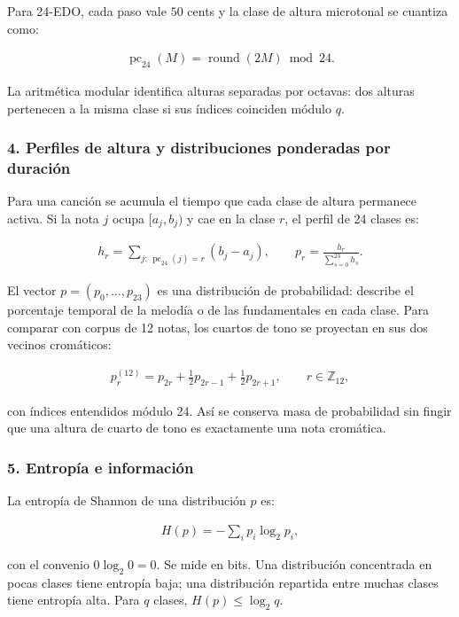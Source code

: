 \documentclass[11pt, a4paper]{article}
\begin{document}
Para 24-EDO, cada paso vale $50$ cents y la clase de altura microtonal se cuantiza como:

\begin{align}
\operatorname{pc}_{24}(M)=\operatorname{round}(2M)\bmod 24.
\end{align}

La aritmética modular identifica alturas separadas por octavas: dos alturas pertenecen a la misma clase si sus índices coinciden módulo $q$.

\subsubsection*{4. Perfiles de altura y distribuciones ponderadas por duración}

Para una canción se acumula el tiempo que cada clase de altura permanece activa. Si la nota $j$ ocupa $[a_j,b_j)$ y cae en la clase $r$, el perfil de 24 clases es:

\begin{align}
h_r=\sum_{j:\,\operatorname{pc}_{24}(j)=r}(b_j-a_j), \qquad
p_r=\frac{h_r}{\sum_{s=0}^{23}h_s}.
\end{align}

El vector $p=(p_0,\ldots,p_{23})$ es una distribución de probabilidad: describe el porcentaje temporal de la melodía o de las fundamentales en cada clase. Para comparar con corpus de 12 notas, los cuartos de tono se proyectan en sus dos vecinos cromáticos:

\begin{align}
p^{(12)}_r=p_{2r}+\frac12p_{2r-1}+\frac12p_{2r+1},
\qquad r\in\mathbb{Z}_{12},
\end{align}

con índices entendidos módulo 24. Así se conserva masa de probabilidad sin fingir que una altura de cuarto de tono es exactamente una nota cromática.

\subsubsection*{5. Entropía e información}

La entropía de Shannon de una distribución $p$ es:

\begin{align}
H(p)=-\sum_i p_i\log_2p_i,
\end{align}

con el convenio $0\log_2 0=0$. Se mide en bits. Una distribución concentrada en pocas clases tiene entropía baja; una distribución repartida entre muchas clases tiene entropía alta. Para $q$ clases, $H(p)\leq\log_2q$.
\end{document}
